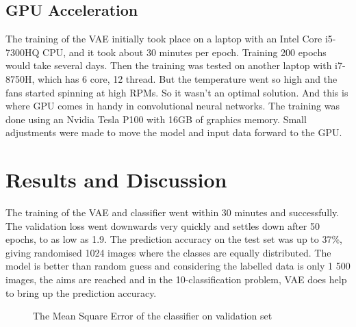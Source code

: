 \documentclass[11pt,a4paper]{report}
\begin{document}
\section{GPU Acceleration}
\label{sec:gpu}

The training of the VAE initially took place on a laptop with an Intel Core i5-7300HQ CPU, and it took about 30 minutes per epoch. Training 200 epochs would take several days. Then the training was tested on another laptop with i7-8750H, which has 6 core, 12 thread. But the temperature went so high and the fans started spinning at high RPMs. So it wasn't an optimal solution. And this is where GPU comes in handy in convolutional neural networks. The training was done using an Nvidia Tesla P100 with 16GB of graphics memory. Small adjustments were made to move the model and input data forward to the GPU.


\chapter{Results and Discussion}
\label{cap:res}

The training of the VAE and classifier went within 30 minutes and successfully. The validation loss went downwards very quickly and settles down after 50 epochs, to as low as 1.9. The prediction accuracy on the test set was up to 37\%, giving randomised 1024 images where the classes are equally distributed. The model is better than random guess and considering the labelled data is only 1 500 images, the aims are reached and in the 10-classification problem, VAE does help to bring up the prediction accuracy.

\begin{figure}[h!]
\noindent{}
\caption{The Mean Square Error of the classifier on validation set}
  \label{fig:err}
\end{figure}
\end{document}
